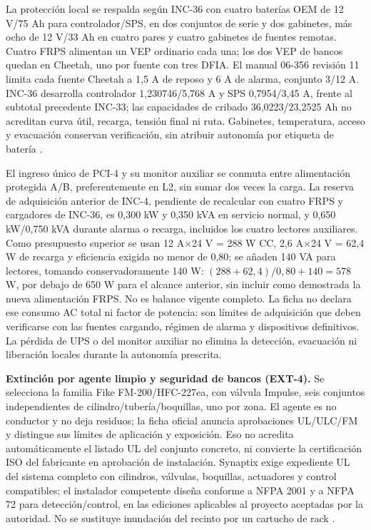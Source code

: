 La protección local se respalda según INC-36 con cuatro baterías OEM de 12 V/75 Ah para controlador/SPS, en dos conjuntos de serie y dos gabinetes, más ocho de 12 V/33 Ah en cuatro pares y cuatro gabinetes de fuentes remotas. Cuatro FRPS alimentan un VEP ordinario cada una; los dos VEP de bancos quedan en Cheetah, uno por fuente con tres DFIA. El manual 06-356 revisión 11 limita cada fuente Cheetah a 1,5 A de reposo y 6 A de alarma, conjunto 3/12 A. INC-36 desarrolla controlador 1,230746/5,768 A y SPS 0,7954/3,45 A, frente al subtotal precedente INC-33; las capacidades de cribado 36,0223/23,2525 Ah no acreditan curva útil, recarga, tensión final ni ruta. Gabinetes, temperatura, acceso y evacuación conservan verificación, sin atribuir autonomía por etiqueta de batería \parencites{lote33-cheetah11}{lote33-frps}.

El ingreso único de PCI-4 y su monitor auxiliar se conmuta entre alimentación protegida A/B, preferentemente en L2, sin sumar dos veces la carga. La reserva de adquisición anterior de INC-4, pendiente de recalcular con cuatro FRPS y cargadores de INC-36, es 0,300 kW y 0,350 kVA en servicio normal, y 0,650 kW/0,750 kVA durante alarma o recarga, incluidos los cuatro lectores auxiliares. Como presupuesto superior se usan 12 A$\times$24 V = 288 W CC, 2,6 A$\times$24 V = 62,4 W de recarga y eficiencia exigida no menor de 0,80; se añaden 140 VA para lectores, tomando conservadoramente 140 W: $(288+62,4)/0,80+140=578$ W, por debajo de 650 W para el alcance anterior, sin incluir como demostrada la nueva alimentación FRPS. No es balance vigente completo. La ficha no declara ese consumo AC total ni factor de potencia: son límites de adquisición que deben verificarse con las fuentes cargando, régimen de alarma y dispositivos definitivos. La pérdida de UPS o del monitor auxiliar no elimina la detección, evacuación ni liberación locales durante la autonomía prescrita.

\textbf{Extinción por agente limpio y seguridad de bancos (EXT-4).}\label{sec:sd4-ext4}
Se selecciona la familia Fike FM-200/HFC-227ea, con válvula Impulse, seis conjuntos independientes de cilindro/tubería/boquillas, uno por zona. El agente es no conductor y no deja residuos; la ficha oficial anuncia aprobaciones UL/ULC/FM y distingue sus límites de aplicación y exposición. Eso no acredita automáticamente el listado UL del conjunto concreto, ni convierte la certificación ISO del fabricante en aprobación de instalación. Synaptix exige expediente UL del sistema completo con cilindros, válvulas, boquillas, actuadores y control compatibles; el instalador competente diseña conforme a NFPA 2001 y a NFPA 72 para detección/control, en las ediciones aplicables al proyecto aceptadas por la autoridad. No se sustituye inundación del recinto por un cartucho de rack \parencites[pp.~1--2]{l18-fm200}[RT-06.17, p.~15]{pucv-transversal}.

